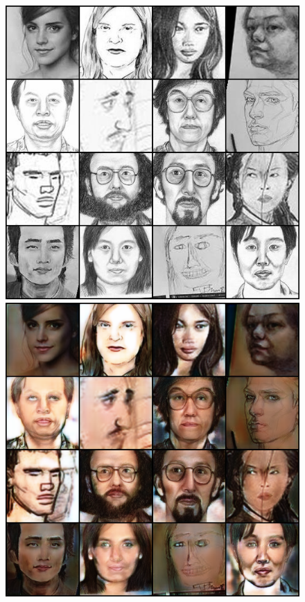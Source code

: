 \begin{figure}[ht]
    \begin{center}
    \includegraphics[scale=0.32]{Graphics/ske2pic_origin_final.png}
    \includegraphics[scale=0.32]{Graphics/ske2pic_result_final.png}


\end{center}
\end{figure}

